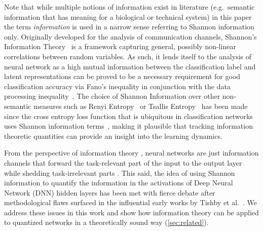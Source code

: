 \documentclass[10pt]{article}
\renewcommand\autoref[1]{\cref{#1}}
\theoremstyle{definition}
\theoremstyle{plain}
\begin{document}
Note that while multiple notions of information exist in literature (e.g.~semantic information that has meaning for a biological or technical system) in this paper the term \emph{information} is used in a narrow sense referring to Shannon information only. Originally developed for the analysis of communication channels, Shannon's Information Theory~\citep{shannon_mathematical_1948} is a framework capturing general, possibly non-linear correlations between random variables. As such, it lends itself to the analysis of neural network as a high mutual information between the classification label and latent representations can be proved to be a necessary requirement for good classification accuracy via Fano's inequality in conjunction with the data processing inequality~\citep[Appendix IV]{geiger_information_2021}. The choice of Shannon Information over other non-semantic measures such as Renyi Entropy~\citep{renyi1961measures} or Tsallis Entropy~\citep{tsallis1988possible} has been made since the cross entropy loss function that is ubiquitous in classification networks uses Shannon information terms~\citep{goodfellow2016deep}, making it plausible that tracking information theoretic quantities can provide an insight into the learning dynamics.



From the perspective of information theory \citep{shannon_mathematical_1948}, neural networks are just information channels that forward the task-relevant part of the input to the output layer while shedding task-irrelevant parts \citep{tishby_deep_2015}. This said, the idea of using Shannon information to quantify the information in the activations of Deep Neural Network (DNN) hidden layers has been met with fierce debate after methodological flaws surfaced \citep{saxe_information_2019, goldfeld_estimating_2019} in the influential early works by Tishby et al.~\citep{tishby_deep_2015, shwartz-ziv_opening_2017}. We address these issues in this work and show how information theory can be applied to quantized networks in a theoretically sound way (\autoref{sec:related}).
\end{document}
